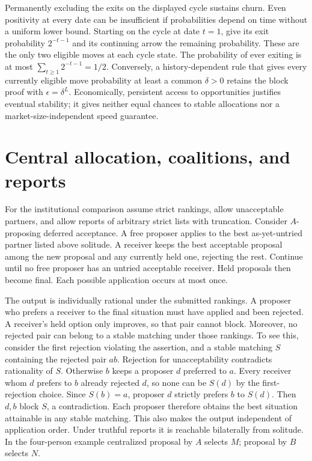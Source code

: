 \documentclass[11pt]{article}
\begin{document}
Permanently excluding the exits on the displayed cycle sustains churn. Even positivity at every date can be insufficient if probabilities depend on time without a uniform lower bound. Starting on the cycle at date \(t=1\), give its exit probability \(2^{-t-1}\) and its continuing arrow the remaining probability. These are the only two eligible moves at each cycle state. The probability of ever exiting is at most \(\sum_{t\geq1}2^{-t-1}=1/2\). Conversely, a history-dependent rule that gives every currently eligible move probability at least a common \(\delta>0\) retains the block proof with \(\epsilon=\delta^L\). Economically, persistent access to opportunities justifies eventual stability; it gives neither equal chances to stable allocations nor a market-size-independent speed guarantee.

\section{Central allocation, coalitions, and reports}

For the institutional comparison assume strict rankings, allow unacceptable partners, and allow reports of arbitrary strict lists with truncation. Consider \(A\)-proposing deferred acceptance. A free proposer applies to the best as-yet-untried partner listed above solitude. A receiver keeps the best acceptable proposal among the new proposal and any currently held one, rejecting the rest. Continue until no free proposer has an untried acceptable receiver. Held proposals then become final. Each possible application occurs at most once.

The output is individually rational under the submitted rankings. A proposer who prefers a receiver to the final situation must have applied and been rejected. A receiver's held option only improves, so that pair cannot block. Moreover, no rejected pair can belong to a stable matching under those rankings. To see this, consider the first rejection violating the assertion, and a stable matching \(S\) containing the rejected pair \(a b\). Rejection for unacceptability contradicts rationality of \(S\). Otherwise \(b\) keeps a proposer \(d\) preferred to \(a\). Every receiver whom \(d\) prefers to \(b\) already rejected \(d\), so none can be \(S(d)\) by the first-rejection choice. Since \(S(b)=a\), proposer \(d\) strictly prefers \(b\) to \(S(d)\). Then \(d,b\) block \(S\), a contradiction. Each proposer therefore obtains the best situation attainable in any stable matching. This also makes the output independent of application order. Under truthful reports it is reachable bilaterally from solitude. In the four-person example centralized proposal by \(A\) selects \(M\); proposal by \(B\) selects \(N\).
\end{document}
